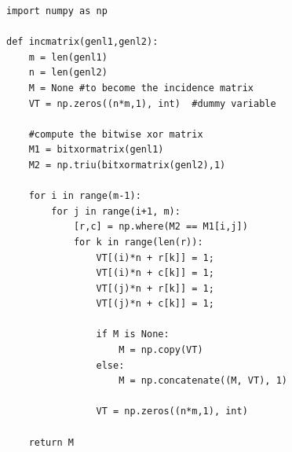 \begin{verbatim}
import numpy as np

def incmatrix(genl1,genl2):
    m = len(genl1)
    n = len(genl2)
    M = None #to become the incidence matrix
    VT = np.zeros((n*m,1), int)  #dummy variable

    #compute the bitwise xor matrix
    M1 = bitxormatrix(genl1)
    M2 = np.triu(bitxormatrix(genl2),1)

    for i in range(m-1):
        for j in range(i+1, m):
            [r,c] = np.where(M2 == M1[i,j])
            for k in range(len(r)):
                VT[(i)*n + r[k]] = 1;
                VT[(i)*n + c[k]] = 1;
                VT[(j)*n + r[k]] = 1;
                VT[(j)*n + c[k]] = 1;

                if M is None:
                    M = np.copy(VT)
                else:
                    M = np.concatenate((M, VT), 1)

                VT = np.zeros((n*m,1), int)

    return M
\end{verbatim}